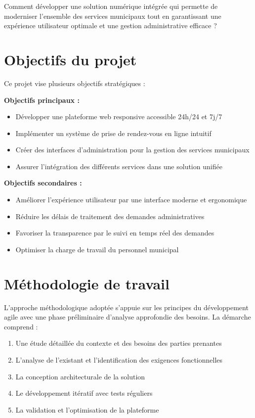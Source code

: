 Comment développer une solution numérique intégrée qui permette de moderniser l'ensemble des services municipaux tout en garantissant une expérience utilisateur optimale et une gestion administrative efficace ?

\section*{Objectifs du projet}

Ce projet vise plusieurs objectifs stratégiques :

\textbf{Objectifs principaux :}
\begin{itemize}
\item Développer une plateforme web responsive accessible 24h/24 et 7j/7
\item Implémenter un système de prise de rendez-vous en ligne intuitif
\item Créer des interfaces d'administration pour la gestion des services municipaux
\item Assurer l'intégration des différents services dans une solution unifiée
\end{itemize}

\textbf{Objectifs secondaires :}
\begin{itemize}
\item Améliorer l'expérience utilisateur par une interface moderne et ergonomique
\item Réduire les délais de traitement des demandes administratives
\item Favoriser la transparence par le suivi en temps réel des demandes
\item Optimiser la charge de travail du personnel municipal
\end{itemize}

\section*{Méthodologie de travail}

L'approche méthodologique adoptée s'appuie sur les principes du développement agile avec une phase préliminaire d'analyse approfondie des besoins. La démarche comprend :

\begin{enumerate}
\item Une étude détaillée du contexte et des besoins des parties prenantes
\item L'analyse de l'existant et l'identification des exigences fonctionnelles
\item La conception architecturale de la solution
\item Le développement itératif avec tests réguliers
\item La validation et l'optimisation de la plateforme
\end{enumerate}

